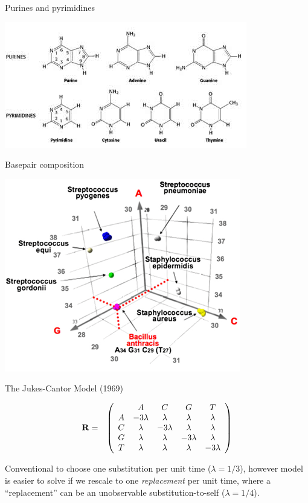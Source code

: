 \documentclass{beamer}
\begin{document}
\begin{frame}{Purines and pyrimidines}

  \includegraphics[width=\textwidth]{purines_pyrimidines.jpg}

\end{frame}

\begin{frame}{Basepair composition}

  \includegraphics[width=.8\textwidth]{composition.png}

\end{frame}

\begin{frame}{The Jukes-Cantor Model (1969)}

\begin{eqnarray*}
{\bf R} & = & \left( \begin{array}{ccccc}
& A & C & G & T \\
A & -3\lambda & \lambda & \lambda & \lambda \\
C & \lambda & -3\lambda & \lambda & \lambda \\
G & \lambda & \lambda & -3\lambda & \lambda \\
T & \lambda & \lambda & \lambda & -3\lambda
\end{array} \right)
\end{eqnarray*}

Conventional to choose one substitution per unit time ($\lambda=1/3$),
however model is easier to solve if we rescale to one {\em replacement} per unit time,
where a ``replacement'' can be an unobservable substitution-to-self ($\lambda=1/4$).

\end{frame}
\end{document}
